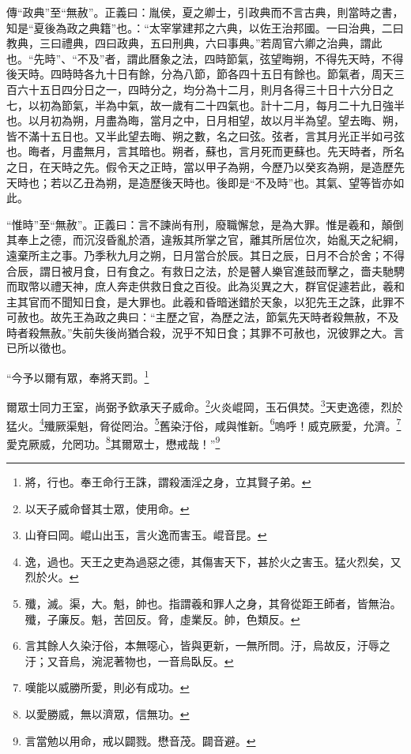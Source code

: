 {\noindent\zhuan{}\fzbyks 傳“政典”至“無赦”。正義曰：胤侯，夏之卿士，引政典而不言古典，則當時之書，知是“夏後為政之典籍”也。：“太宰掌建邦之六典，以佐王治邦國。一曰治典，二曰教典，三曰禮典，四曰政典，五曰刑典，六曰事典。”若周官六卿之治典，謂此也。“先時”、“不及”者，謂此曆象之法，四時節氣，弦望晦朔，不得先天時，不得後天時。四時時各九十日有餘，分為八節，節各四十五日有餘也。節氣者，周天三百六十五日四分日之一，四時分之，均分為十二月，則月各得三十日十六分日之七，以初為節氣，半為中氣，故一歲有二十四氣也。計十二月，每月二十九日強半也。以月初為朔，月盡為晦，當月之中，日月相望，故以月半為望。望去晦、朔，皆不滿十五日也。又半此望去晦、朔之數，名之曰弦。弦者，言其月光正半如弓弦也。晦者，月盡無月，言其暗也。朔者，蘇也，言月死而更蘇也。先天時者，所名之日，在天時之先。假令天之正時，當以甲子為朔，今歷乃以癸亥為朔，是造歷先天時也；若以乙丑為朔，是造歷後天時也。後即是“不及時”也。其氣、望等皆亦如此。 \par}

{\noindent\shu{}\fzkt “惟時”至“無赦”。正義曰：言不諫尚有刑，廢職懈怠，是為大罪。惟是羲和，顛倒其奉上之德，而沉沒昏亂於酒，違叛其所掌之官，離其所居位次，始亂天之紀綱，遠棄所主之事。乃季秋九月之朔，日月當合於辰。其日之辰，日月不合於舍；不得合辰，謂日被月食，日有食之。有救日之法，於是瞽人樂官進鼓而擊之，嗇夫馳騁而取幣以禮天神，庶人奔走供救日食之百役。此為災異之大，群官促遽若此，羲和主其官而不聞知日食，是大罪也。此羲和昏暗迷錯於天象，以犯先王之誅，此罪不可赦也。故先王為政之典曰：“主歷之官，為歷之法，節氣先天時者殺無赦，不及時者殺無赦。”失前失後尚猶合殺，況乎不知日食；其罪不可赦也，況彼罪之大。言已所以徵也。 \par}

“今予以爾有眾，奉將天罰。\footnote{將，行也。奉王命行王誅，謂殺湎淫之身，立其賢子弟。}

爾眾士同力王室，尚弼予欽承天子威命。\footnote{以天子威命督其士眾，使用命。}火炎崐岡，玉石俱焚。\footnote{山脊曰岡。崐山出玉，言火逸而害玉。崐音昆。}天吏逸德，烈於猛火。\footnote{逸，過也。天王之吏為過惡之德，其傷害天下，甚於火之害玉。猛火烈矣，又烈於火。}殲厥渠魁，脅從罔治。\footnote{殲，滅。渠，大。魁，帥也。指謂羲和罪人之身，其脅從距王師者，皆無治。殲，子廉反。魁，苦回反。脅，虛業反。帥，色類反。}舊染汙俗，咸與惟新。\footnote{言其餘人久染汙俗，本無噁心，皆與更新，一無所問。汙，烏故反，汙辱之汙；又音烏，涴泥著物也，一音烏臥反。}嗚呼！威克厥愛，允濟。\footnote{嘆能以威勝所愛，則必有成功。}愛克厥威，允罔功。\footnote{以愛勝威，無以濟眾，信無功。}其爾眾士，懋戒哉！”\footnote{言當勉以用命，戒以闢戮。懋音茂。闢音避。}


